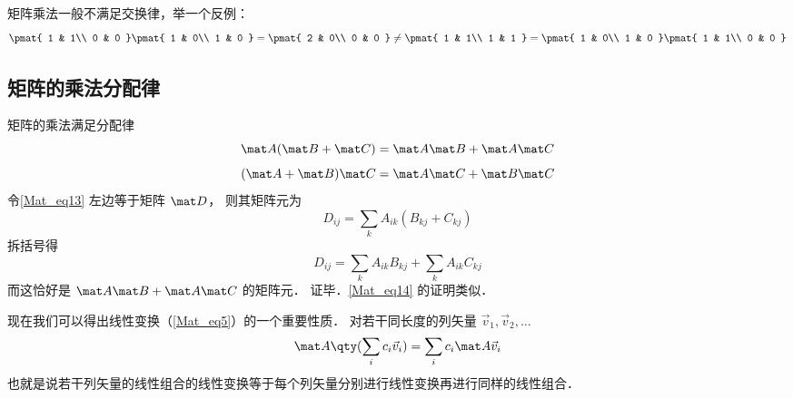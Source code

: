 矩阵乘法一般不满足交换律，举一个反例：
\begin{equation}
\pmat{ 1 & 1\\ 0 & 0 }
\pmat{ 1 & 0\\ 1 & 0 } =
\pmat{ 2 & 0\\ 0 & 0 } \ne
\pmat{ 1 & 1\\ 1 & 1 } =
\pmat{ 1 & 0\\ 1 & 0 }
\pmat{ 1 & 1\\ 0 & 0 }
\end{equation}

\subsection{矩阵的乘法分配律}
矩阵的乘法满足分配律
\begin{equation}\label{Mat_eq13}
\mat A (\mat B + \mat C) = \mat A \mat B + \mat A \mat C
\end{equation}
\begin{equation}\label{Mat_eq14}
(\mat A + \mat B) \mat C = \mat A \mat C + \mat B \mat C
\end{equation}
令\autoref{Mat_eq13} 左边等于矩阵 $\mat D$， 则其矩阵元为
\begin{equation}
D_{ij} = \sum_k A_{ik} (B_{kj} + C_{kj})
\end{equation}
拆括号得
\begin{equation}
D_{ij} = \sum_k A_{ik}B_{kj} + \sum_k A_{ik}C_{kj}
\end{equation}
而这恰好是 $\mat A \mat B + \mat A \mat C$ 的矩阵元． 证毕．\autoref{Mat_eq14} 的证明类似．

现在我们可以得出线性变换（\autoref{Mat_eq5}）的一个重要性质． 对若干同长度的列矢量 $\vec v_1, \vec v_2, \dots$
\begin{equation}
\mat A \qty(\sum_i c_i \vec v_i) = \sum_i c_i \mat A \vec v_i
\end{equation}
也就是说若干列矢量的线性组合的线性变换等于每个列矢量分别进行线性变换再进行同样的线性组合．

